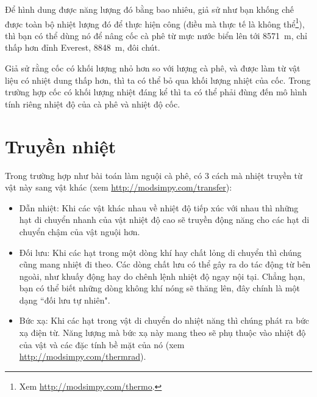 \documentclass[12pt, openany]{book}
\theoremstyle{exercise}
\begin{document}
Để hình dung được năng lượng đó bằng bao nhiêu, giả sử như bạn khống chế được toàn bộ nhiệt lượng đó để thực hiện công (điều mà thực tế là không thể\footnote{Xem \url{http://modsimpy.com/thermo}.}), thì bạn có thể dùng nó để nâng cốc cà phê từ mực nước biển lên tới \SI{8571}{\meter}, chỉ thấp hơn đỉnh Everest, \SI{8848}{\meter}, đôi chút.


Giả sử rằng cốc có khối lượng nhỏ hơn so với lượng cà phê, và được làm từ vật liệu có nhiệt dung thấp hơn, thì ta có thể bỏ qua khối lượng nhiệt của cốc. Trong trường hợp cốc có khối lượng nhiệt đáng kể thì ta có thể phải đùng đến mô hình tính riêng nhiệt độ của cà phê và nhiệt độ cốc.


\section{Truyền nhiệt}

Trong trường hợp như bài toán làm nguội cà phê, có 3 cách mà nhiệt truyền từ vật này sang vật khác (xem \url{http://modsimpy.com/transfer}):


\begin{itemize}

\item Dẫn nhiệt: Khi các vật khác nhau về nhiệt độ tiếp xúc với nhau thì những hạt di chuyển nhanh của vật nhiệt độ cao sẽ truyền động năng cho các hạt di chuyển chậm của vật nguội hơn.

\item Đối lưu: Khi các hạt trong một dòng khí hay chất lỏng di chuyển thì chúng cũng mang nhiệt đi theo. Các dòng chất lưu có thể gây ra do tác động từ bên ngoài, như khuấy động hay do chênh lệnh nhiệt độ ngay nội tại. Chẳng hạn, bạn có thể biết những dòng không khí nóng sẽ thăng lên, đây chính là một dạng ``đối lưu tự nhiên".


\item Bức xạ: Khi các hạt trong vật di chuyển do nhiệt năng thì chúng phát ra bức xạ điện từ. Năng lượng mà bức xạ này mang theo sẽ phụ thuộc vào nhiệt độ của vật và các đặc tính bề mặt của nó (xem \url{http://modsimpy.com/thermrad}).

\end{itemize}
\end{document}
